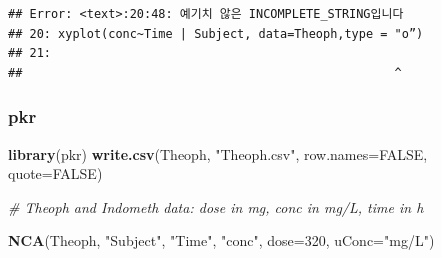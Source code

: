 \documentclass[]{krantz}
\makeatletter
\newenvironment{Shaded}{\begin{snugshade}}{\end{snugshade}}
\newcommand{\KeywordTok}[1]{\textcolor[rgb]{0.13,0.29,0.53}{\textbf{#1}}}
\newcommand{\DataTypeTok}[1]{\textcolor[rgb]{0.13,0.29,0.53}{#1}}
\newcommand{\DecValTok}[1]{\textcolor[rgb]{0.00,0.00,0.81}{#1}}
\newcommand{\StringTok}[1]{\textcolor[rgb]{0.31,0.60,0.02}{#1}}
\newcommand{\CommentTok}[1]{\textcolor[rgb]{0.56,0.35,0.01}{\textit{#1}}}
\newcommand{\OtherTok}[1]{\textcolor[rgb]{0.56,0.35,0.01}{#1}}
\newcommand{\NormalTok}[1]{#1}
\newenvironment{kframe}{%
\medskip{}
\setlength{\fboxsep}{.8em}
 \def\at@end@of@kframe{}%
 \ifinner\ifhmode%
  \def\at@end@of@kframe{\end{minipage}}%
  \begin{minipage}{\columnwidth}%
 \fi\fi%
 \def\FrameCommand##1{\hskip\@totalleftmargin \hskip-\fboxsep
 \colorbox{shadecolor}{##1}\hskip-\fboxsep
     \hskip-\linewidth \hskip-\@totalleftmargin \hskip\columnwidth}%
 \MakeFramed {\advance\hsize-\width
   \@totalleftmargin\z@ \linewidth\hsize
   \@setminipage}}%
 {\par\unskip\endMakeFramed%
 \at@end@of@kframe}
\renewenvironment{Shaded}{\begin{kframe}}{\end{kframe}}
\theoremstyle{definition}
\theoremstyle{definition}
\theoremstyle{definition}
\theoremstyle{remark}
\makeatother
\begin{document}
\begin{verbatim}
## Error: <text>:20:48: 예기치 않은 INCOMPLETE_STRING입니다
## 20: xyplot(conc~Time | Subject, data=Theoph,type = "o”)
## 21:        
##                                                    ^
\end{verbatim}

\subsubsection{pkr}\label{pkr}

\begin{Shaded}
\begin{Highlighting}[]
\KeywordTok{library}\NormalTok{(pkr)}
\KeywordTok{write.csv}\NormalTok{(Theoph, }\StringTok{"Theoph.csv"}\NormalTok{, }\DataTypeTok{row.names=}\OtherTok{FALSE}\NormalTok{, }\DataTypeTok{quote=}\OtherTok{FALSE}\NormalTok{)}

\CommentTok{# Theoph and Indometh data: dose in mg, conc in mg/L, time in h}

\KeywordTok{NCA}\NormalTok{(Theoph, }\StringTok{"Subject"}\NormalTok{, }\StringTok{"Time"}\NormalTok{, }\StringTok{"conc"}\NormalTok{, }\DataTypeTok{dose=}\DecValTok{320}\NormalTok{, }\DataTypeTok{uConc=}\StringTok{"mg/L"}\NormalTok{)}
\end{Highlighting}
\end{Shaded}
\end{document}
